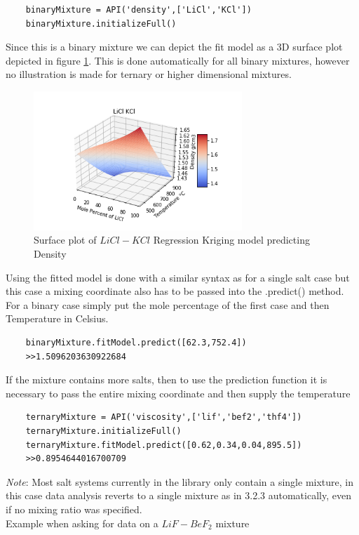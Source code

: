 \begin{verbatim}
    binaryMixture = API('density',['LiCl','KCl'])
    binaryMixture.initializeFull()
\end{verbatim}
Since this is a binary mixture we can depict the fit model as a 3D surface plot depicted in figure \ref{fig:liclsurfade}. This is done automatically for all binary mixtures, however no illustration is made for ternary or higher dimensional mixtures.

\begin{figure}[h]
    \centering
    \includegraphics[width = 0.7\textwidth]{msdf/figures/LiClSurface.png}
    \caption{Surface plot of $LiCl-KCl$ Regression Kriging model predicting Density}
    \label{fig:liclsurfade}
\end{figure}

Using the fitted model is done with a similar syntax as for a single salt case but this case a mixing coordinate also has to be passed into the .predict() method. For a binary case simply put the mole percentage of the first case and then Temperature in Celsius. 

\begin{verbatim}
    binaryMixture.fitModel.predict([62.3,752.4])
    >>1.5096203630922684
\end{verbatim}
If the mixture contains more salts, then to use the prediction function it is necessary to pass the entire mixing coordinate and then supply the temperature

\begin{verbatim}
    ternaryMixture = API('viscosity',['lif','bef2','thf4'])
    ternaryMixture.initializeFull()
    ternaryMixture.fitModel.predict([0.62,0.34,0.04,895.5])
    >>0.8954644016700709
\end{verbatim}


\textit{Note}: Most salt systems currently in the library only contain a single mixture, in this case data analysis reverts to a single mixture as in 3.2.3 automatically, even if no mixing ratio was specified.\\
Example when asking for data on a $LiF-BeF_2$ mixture

